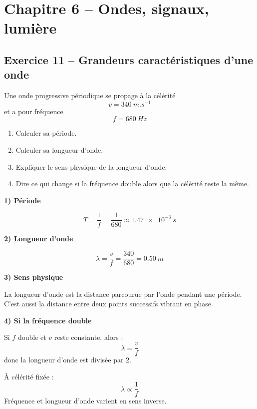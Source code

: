 \documentclass[11pt,a4paper]{article}
\begin{document}
\section{Chapitre 6 -- Ondes, signaux, lumière}

\subsection{Exercice 11 -- Grandeurs caractéristiques d'une onde}

\begin{enoncebox}
Une onde progressive périodique se propage à la célérité
\[
v = \SI{340}{m.s^{-1}}
\]
et a pour fréquence
\[
f = \SI{680}{Hz}
\]

\begin{enumerate}[label=\arabic*)]
    \item Calculer sa période.
    \item Calculer sa longueur d'onde.
    \item Expliquer le sens physique de la longueur d'onde.
    \item Dire ce qui change si la fréquence double alors que la célérité reste la même.
\end{enumerate}
\end{enoncebox}

\begin{corrigebox}
\textbf{1) Période}

\[
T = \frac{1}{f} = \frac{1}{680} \approx \SI{1.47e-3}{s}
\]

\textbf{2) Longueur d'onde}

\[
\lambda = \frac{v}{f} = \frac{340}{680} = \SI{0.50}{m}
\]

\textbf{3) Sens physique}

La longueur d'onde est la distance parcourue par l'onde pendant une période.  
C'est aussi la distance entre deux points successifs vibrant en phase.

\textbf{4) Si la fréquence double}

Si \(f\) double et \(v\) reste constante, alors :
\[
\lambda = \frac{v}{f}
\]
donc la longueur d'onde est divisée par 2.

\begin{attentionbox}
À célérité fixée :
\[
\lambda \propto \frac{1}{f}
\]
Fréquence et longueur d'onde varient en sens inverse.
\end{attentionbox}
\end{corrigebox}
\end{document}

